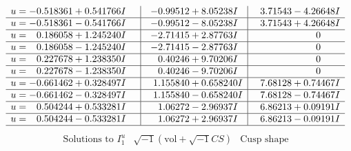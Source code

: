 \documentclass[1p]{elsarticle_modified}
\theoremstyle{definition}
\newcommand{\I}{\sqrt{-1}}
\begin{document}
$$\begin{array}{c|c|c}
\begin{aligned}
u &= -0.518361 + 0.541766 I\end{aligned}
 & -0.99512 + 8.05238 I & \phantom{-}3.71543 - 4.26648 I \\ \hline\begin{aligned}
u &= -0.518361 - 0.541766 I\end{aligned}
 & -0.99512 - 8.05238 I & \phantom{-}3.71543 + 4.26648 I \\ \hline\begin{aligned}
u &= \phantom{-}0.186058 + 1.245240 I\end{aligned}
 & -2.71415 + 2.87763 I & \phantom{-0.000000 } 0 \\ \hline\begin{aligned}
u &= \phantom{-}0.186058 - 1.245240 I\end{aligned}
 & -2.71415 - 2.87763 I & \phantom{-0.000000 } 0 \\ \hline\begin{aligned}
u &= \phantom{-}0.227678 + 1.238350 I\end{aligned}
 & \phantom{-}0.40246 + 9.70206 I & \phantom{-0.000000 } 0 \\ \hline\begin{aligned}
u &= \phantom{-}0.227678 - 1.238350 I\end{aligned}
 & \phantom{-}0.40246 - 9.70206 I & \phantom{-0.000000 } 0 \\ \hline\begin{aligned}
u &= -0.661462 + 0.328497 I\end{aligned}
 & \phantom{-}1.155840 + 0.658240 I & \phantom{-}7.68128 + 0.74467 I \\ \hline\begin{aligned}
u &= -0.661462 - 0.328497 I\end{aligned}
 & \phantom{-}1.155840 - 0.658240 I & \phantom{-}7.68128 - 0.74467 I \\ \hline\begin{aligned}
u &= \phantom{-}0.504244 + 0.533281 I\end{aligned}
 & \phantom{-}1.06272 - 2.96937 I & \phantom{-}6.86213 + 0.09191 I \\ \hline\begin{aligned}
u &= \phantom{-}0.504244 - 0.533281 I\end{aligned}
 & \phantom{-}1.06272 + 2.96937 I & \phantom{-}6.86213 - 0.09191 I\\
 \hline 
 \end{array}$$\newpage$$\begin{array}{c|c|c}  
\text{Solutions to }I^u_{1}& \I (\text{vol} + \sqrt{-1}CS) & \text{Cusp shape}\\

\end{array}$$
\end{document}
